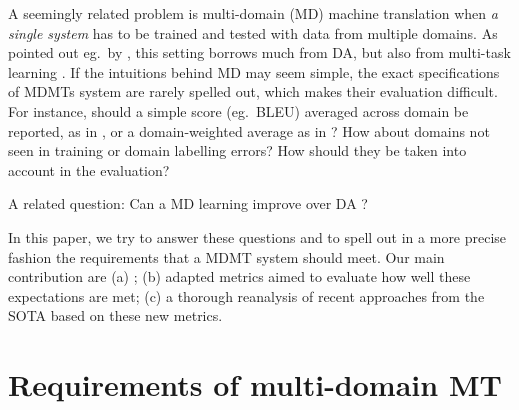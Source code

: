 \documentclass[11pt]{article}
\begin{document}
A seemingly related problem is multi-domain (MD) machine translation \cite{Hassan17neural,Farajian17multidomain,Kobus17domaincontrol,Zeng18multidomain,Pham19generic} when \emph{a single system} has to be trained  and tested with data from multiple domains. As pointed out eg.\ by , this setting borrows much from DA, but also from multi-task learning \cite{}.  If the intuitions behind MD may seem simple, the exact specifications of MDMTs system are rarely spelled out, which makes their evaluation difficult. For instance, should a simple score (eg.\ BLEU) averaged across domain be reported, as in \cite{Farajian17multidomain}, or a domain-weighted average as in \cite{}? How about domains not seen in training or domain labelling errors? How should they be taken into account in the evaluation?

A related question: Can a MD learning improve over DA ? 
 
In this paper, we try to answer these questions and to spell out in a more precise fashion the requirements that a MDMT system should meet. Our main contribution are (a) ;  (b) adapted metrics aimed to evaluate how well these expectations are met; (c) a thorough reanalysis of recent approaches from the SOTA based on these new metrics. 
 

\section{Requirements of multi-domain MT \label{sec:requirements}}
\end{document}
